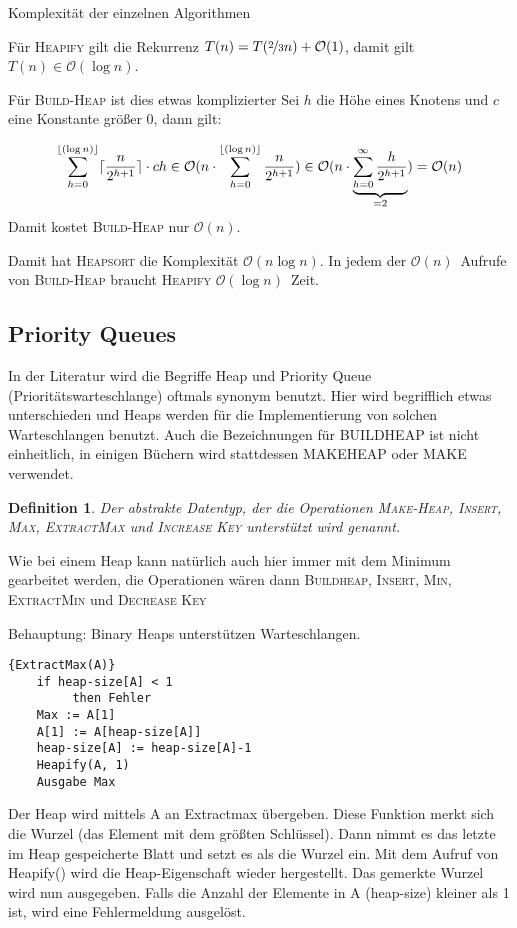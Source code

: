 \documentclass[ngerman,draft,parskip=half*,twoside]{scrreprt}
\theoremstyle{break}
\newtheorem{definition}{Definition}[chapter]
\theoremstyle{nonumberbreak}
\newcommand*{\OO}{\mathcal{O}}      %
\DeclarePairedDelimiter{\floor}{\lfloor}{\rfloor}
\DeclarePairedDelimiter{\ceil}{\lceil}{\rceil}
\newcommand*{\highl}[2][]{\textbf{\boldmath{#2}}%
  \ifthenelse{\equal{#1}{}}{\index{#2}}{\index{#1}}%
}
\begin{document}
Komplexität der einzelnen Algorithmen

Für \textsc{Heapify} gilt die Rekurrenz
$T(n)=T(\nicefrac{2}{3}n)+\OO(1)$, damit gilt $T(n)\in\OO(\log n)$.

Für \textsc{Build-Heap} ist dies etwas komplizierter Sei $h$ die Höhe eines Knotens und $c$ eine Konstante größer 0, dann gilt:
 
\[\sum_{h=0}^{\floor{(\log n)}}\ceil{\frac{n}{2^{h+1}}} \cdot ch \in \OO(n\cdot\sum_{h=0}^{\floor{(\log
n)}}
\frac{n}{2^{h+1}}) \in \OO(n\cdot\underbrace{\sum_{h=0}^{\infty}
\frac{h}{2^{h+1}}}_{=2})=\OO(n)\] 
Damit kostet \textsc{Build-Heap} nur $\OO(n)$.

Damit hat \textsc{Heapsort} die Komplexität $\OO(n \log n)$. In jedem der $\OO(n)$~Aufrufe von \textsc{Build-Heap}  braucht
\textsc{Heapify} $\OO(\log n)$~Zeit.
%
\subsection{Priority Queues}
In der Literatur wird die Begriffe Heap und Priority Queue (Prioritätswarteschlange) oftmals synonym benutzt. Hier wird begrifflich
etwas unterschieden und Heaps werden für die Implementierung von solchen Warteschlangen benutzt. Auch die Bezeichnungen für
\textsc{BUILDHEAP} ist nicht einheitlich, in einigen Büchern wird stattdessen \textsc{MAKEHEAP} oder \textsc{MAKE} verwendet.

\begin{definition}
Der abstrakte Datentyp, der die Operationen \textsc{Make-Heap, Insert, Max, ExtractMax} und \textsc{Increase Key} unterstützt wird
\highl{Priority
Queue} genannt.
\end{definition}

Wie bei einem Heap kann natürlich auch hier immer mit dem Minimum gearbeitet werden, die Operationen wären dann \textsc{Buildheap,
Insert, Min, ExtractMin} und \textsc{Decrease Key}

Behauptung: Binary Heaps unterstützen Warteschlangen.

\begin{Algorithmus}[ht]
\begin{lstlisting}[frame=tlrb, mathescape=true, title=\textsc{ExtractMax\textnormal{(A)}}, gobble=4]{ExtractMax(A)}
    if heap-size[A] < 1
         then Fehler
    Max := A[1]
    A[1] := A[heap-size[A]]
    heap-size[A] := heap-size[A]-1
    Heapify(A, 1)
    Ausgabe Max
\end{lstlisting}

Der Heap wird mittels A an Extractmax übergeben. Diese Funktion merkt sich die Wurzel (das Element mit dem größten Schlüssel).
Dann nimmt es das letzte im Heap gespeicherte Blatt und setzt es als die Wurzel ein. Mit dem Aufruf von Heapify() wird die
Heap-Eigenschaft wieder hergestellt. Das gemerkte Wurzel wird nun ausgegeben.
Falls die Anzahl der Elemente in A (heap-size) kleiner als 1 ist, wird eine Fehlermeldung ausgelöst.
\end{Algorithmus}
\end{document}
